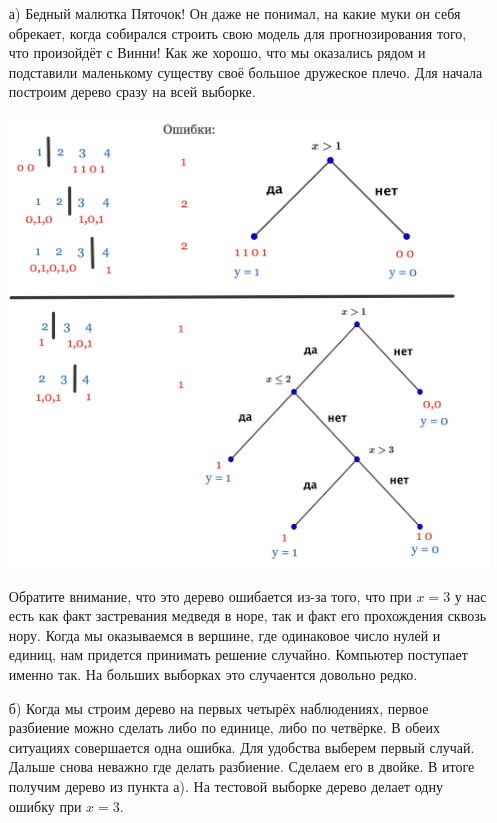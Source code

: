 \documentclass[12pt, a4paper, oneside]{article}
\theoremstyle{plain} %
\theoremstyle{definition}
\begin{document}
\begin{solution}
\begin{enumerate}
	\item[а)]  Бедный малютка Пяточок! Он даже не понимал, на какие муки он себя обрекает, когда собирался строить свою модель для прогнозирования того, что произойдёт с Винни! Как же хорошо, что мы оказались рядом и подставили маленькому существу своё большое дружеское плечо.  Для начала построим дерево сразу на всей выборке. 
	
	\begin{center}
	    \includegraphics[scale=0.28]{class_tree_6.png}
	\end{center} 	

	Обратите внимание, что это дерево ошибается из-за того, что при  $x=3$ у нас есть как факт застревания медведя в норе, так и факт его прохождения сквозь нору. Когда мы оказываемся в вершине, где одинаковое число нулей и единиц, нам придется принимать решение случайно. Компьютер поступает именно так. На больших выборках это случаентся довольно редко. 

	\item[б)]  Когда мы строим дерево на первых четырёх наблюдениях, первое разбиение можно сделать либо по единице, либо по четвёрке. В обеих ситуациях совершается одна ошибка. Для удобства выберем первый случай. Дальше снова неважно где делать разбиение. Сделаем его в двойке. В итоге получим дерево из пункта а). На тестовой выборке дерево делает одну ошибку при $x=3$.
	

\end{enumerate}
\end{solution}
\end{document}
